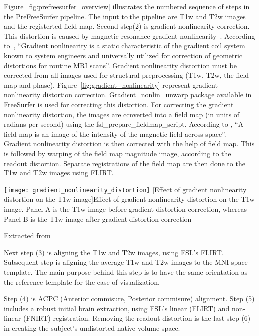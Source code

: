 \indent Figure~\ref{fig:prefreesurfer_overview} illustrates the numbered sequence of steps in the PreFreeSurfer pipeline. The input to the pipeline are T1w and T2w images and the registerted field map. Second step(2) is gradient nonlinearity correction. This distortion is caused by magnetic resonance gradient nonlinearity~\cite{Gla13}. According to~\cite{Zou2004}, ``Gradient nonlinearity is a static characteristic of the gradient coil system known to system engineers and universally utilized for correction of geometric distortions for routine MRI scans''. Gradient nonlinearity distortion must be corrected from all images used for structural preprocessing (T1w, T2w, the field map and phase). Figure~\ref{fig:gradient_nonlinearity} represent gradient nonlinearity distortion correction. Gradient\_nonlin\_unwarp package available in FreeSurfer is used for correcting this distortion. For correcting the gradient nonlinearity distortion, the images are converted into a field map (in units of radians per second) using the fsl\_prepare\_fieldmap\_script. According to \cite{field_map}, ``A field map is an image of the intensity of the magnetic field across space''. Gradient nonlinearity distortion is then corrected with the help of field map. This is followed by warping of the field map magnitude image, according to the readout distortion. Separate registrations of the field map are then done to the T1w and T2w images using FLIRT.

\begin{center}
  \texttt{[image: gradient\_nonlinearity\_distortion]}
  [Effect of gradient nonlinearity distortion on the T1w image]{Effect of gradient nonlinearity distortion on the T1w image. Panel A is the T1w image before gradient distortion correction, whereas Panel B is the T1w image after gradient distortion correction}
  \label{fig:gradient_nonlinearity}
  \caption*{Extracted from \cite{Gla13}}
\end{center}

\indent Next step (3) is aligning the T1w and T2w images, using FSL's FLIRT. Subsequent step is aligning the average T1w and T2w images to the MNI space template. The main purpose behind this step is to have the same orientation as the reference template for the ease of visualization.

\indent Step (4) is ACPC (Anterior commisure, Posterior commisure) alignment. Step (5) includes a robust initial brain extraction, using FSL's linear (FLIRT) and non-linear (FNIRT) registration. Removing the readout distortion is the last step (6) in creating the subject's undistorted native volume space. %

